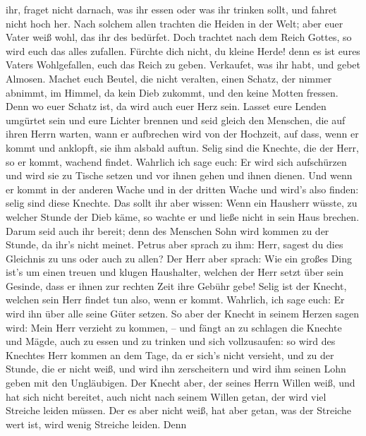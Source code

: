 ihr, fraget nicht darnach, was ihr essen oder was ihr trinken sollt, und
fahret nicht hoch her.  Nach solchem allen trachten die
Heiden in der Welt; aber euer Vater weiß wohl, das ihr des bedürfet.
 Doch trachtet nach dem Reich Gottes, so wird euch das
alles zufallen.  Fürchte dich nicht, du kleine Herde! denn
es ist eures Vaters Wohlgefallen, euch das Reich zu geben. 
Verkaufet, was ihr habt, und gebet Almosen. Machet euch Beutel, die
nicht veralten, einen Schatz, der nimmer abnimmt, im Himmel, da kein
Dieb zukommt, und den keine Motten fressen.  Denn wo euer
Schatz ist, da wird auch euer Herz sein.  Lasset eure
Lenden umgürtet sein und eure Lichter brennen  und seid
gleich den Menschen, die auf ihren Herrn warten, wann er aufbrechen wird
von der Hochzeit, auf dass, wenn er kommt und anklopft, sie ihm alsbald
auftun.  Selig sind die Knechte, die der Herr, so er kommt,
wachend findet. Wahrlich ich sage euch: Er wird sich aufschürzen und
wird sie zu Tische setzen und vor ihnen gehen und ihnen dienen.
 Und wenn er kommt in der anderen Wache und in der dritten
Wache und wird's also finden: selig sind diese Knechte. 
Das sollt ihr aber wissen: Wenn ein Hausherr wüsste, zu welcher Stunde
der Dieb käme, so wachte er und ließe nicht in sein Haus brechen.
 Darum seid auch ihr bereit; denn des Menschen Sohn wird
kommen zu der Stunde, da ihr's nicht meinet.  Petrus aber
sprach zu ihm: Herr, sagest du dies Gleichnis zu uns oder auch zu allen?
 Der Herr aber sprach: Wie ein großes Ding ist's um einen
treuen und klugen Haushalter, welchen der Herr setzt über sein Gesinde,
dass er ihnen zur rechten Zeit ihre Gebühr gebe!  Selig ist
der Knecht, welchen sein Herr findet tun also, wenn er kommt.
 Wahrlich, ich sage euch: Er wird ihn über alle seine Güter
setzen.  So aber der Knecht in seinem Herzen sagen wird:
Mein Herr verzieht zu kommen, -- und fängt an zu schlagen die Knechte
und Mägde, auch zu essen und zu trinken und sich vollzusaufen:
 so wird des Knechtes Herr kommen an dem Tage, da er sich's
nicht versieht, und zu der Stunde, die er nicht weiß, und wird ihn
zerscheitern und wird ihm seinen Lohn geben mit den Ungläubigen.
 Der Knecht aber, der seines Herrn Willen weiß, und hat
sich nicht bereitet, auch nicht nach seinem Willen getan, der wird viel
Streiche leiden müssen.  Der es aber nicht weiß, hat aber
getan, was der Streiche wert ist, wird wenig Streiche leiden. Denn
